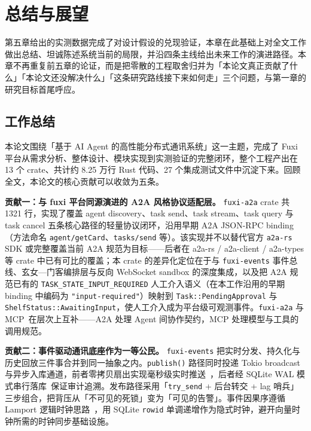 
\section{总结与展望}

第五章给出的实测数据完成了对设计假设的兑现验证，本章在此基础上对全文工作做出总结、坦诚陈述系统当前的局限，并沿四条主线给出未来工作的演进路径。本章不再重复前五章的论证，而是把零散的工程取舍归并为「本论文真正贡献了什么」「本论文还没解决什么」「这条研究路线接下来如何走」三个问题，与第一章的研究目标首尾呼应。

\subsection{工作总结}
\label{subsec:summary}

本论文围绕「基于 AI Agent 的高性能分布式通讯系统」这一主题，完成了 Fuxi 平台从需求分析、整体设计、模块实现到实测验证的完整闭环，整个工程产出在 13 个 crate、共计约 8.25 万行 Rust 代码、27 个集成测试文件中沉淀下来。回顾全文，本论文的核心贡献可以收敛为五条。

\textbf{贡献一：与 fuxi 平台同源演进的 A2A 风格协议适配层。} \texttt{fuxi-a2a} crate 共 1321 行，实现了覆盖 agent discovery、task send、task stream、task query 与 task cancel 五条核心路径的轻量协议闭环，沿用早期 A2A JSON-RPC binding（方法命名 \texttt{agent/getCard}、\texttt{tasks/send} 等）。该实现并不以替代官方 \texttt{a2a-rs} SDK 或完整覆盖当前 A2A 规范为目标——后者在 a2a-rs / a2a-client / a2a-types 等 crate 中已有可比的覆盖；本 crate 的差异化定位在于与 \texttt{fuxi-events} 事件总线、玄女—门客编排层与反向 WebSocket sandbox 的深度集成，以及把 A2A 规范已有的 \texttt{TASK\_STATE\_INPUT\_REQUIRED} 人工介入语义（在本工作沿用的早期 binding 中编码为 \texttt{"input-required"}）映射到 \texttt{Task::PendingApproval} 与 \texttt{ShelfStatus::AwaitingInput}，使人工介入成为平台级可观测事件。\texttt{fuxi-a2a} 与 MCP~\parencite{anthropic2024mcp}在层次上互补——A2A 处理 Agent 间协作契约，MCP 处理模型与工具的调用规范。

\textbf{贡献二：事件驱动通讯底座作为一等公民。} \texttt{fuxi-events} 把实时分发、持久化与历史回放三件事合并到同一抽象之内。\texttt{publish()} 路径同时投递 Tokio broadcast 与异步入库通道，前者零拷贝扇出实现毫秒级实时推送~\parencite{tokio2024broadcast}，后者经 SQLite WAL 模式串行落库~\parencite{sqlite2024wal}保证审计追溯。发布路径采用「\texttt{try\_send} + 后台转交 + lag 哨兵」三步组合，把背压从「不可见的死锁」变为「可见的告警」。事件因果序遵循 Lamport 逻辑时钟思路~\parencite{lamport1978time}，用 SQLite \texttt{rowid} 单调递增作为隐式时钟，避开向量时钟所需的时钟同步基础设施。

